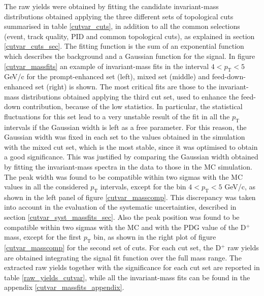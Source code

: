 \documentclass[b5paper,10pt,twoside,oldstyle,classica]{toptesi}
\newcommand{\pt}{p_\text{T}}
\begin{document}
The raw yields were obtained by fitting the candidate invariant-mass distributions obtained applying the three different sets of topological cuts summarised in table \ref{cutvar_cuts}, in addition to all the common selections (event, track quality, PID and common topological cuts), as explained in section \ref{cutvar_cuts_sec}. The fitting function is the sum of an exponential function which describes the background and a Gaussian function for the signal. In figure \ref{cutvar_massfits} an example of invariant-mass fits in the interval $4<\pt<5$ GeV/c for the prompt-enhanced set (left), mixed set (middle) and feed-down-enhanced set (right) is shown. The most critical fits are those to the invariant-mass distributions obtained applying the third cut set, used to enhance the feed-down contribution, because of the low statistics. In particular, the statistical fluctuations for this set lead to a very unstable result of the fit in all the $\pt$ intervals if the Gaussian width is left as a free parameter. For this reason, the Gaussian width was fixed in each set to the values obtained in the simulation with the mixed cut set, which is the most stable, since it was optimised to obtain a good significance. This was justified by comparing the Gaussian width obtained by fitting the invariant-mass spectra in the data to those in the MC simulation. The peak width was found to be compatible within two sigmas with the MC values in all the considered $\pt$ intervals, except for the bin $4<\pt<5$ GeV/c, as shown in the left panel of figure \ref{cutvar_masscomp}. This discrepancy was taken into account in the evaluation of the systematic uncertainties, described in section \ref{cutvar_syst_massfits_sec}. Also the peak position was found to be compatible within two sigmas with the MC and with the PDG value of the D$^+$ mass, except for the first $\pt$ bin, as shown in the right plot of figure \ref{cutvar_masscomp} for the second set of cuts. For each cut set, the D$^+$ raw yields are obtained integrating the signal fit function over the full mass range. The extracted raw yields together with the significance for each cut set are reported in table \ref{raw_yields_cutvar}, while all the invariant-mass fits can be found in the appendix \ref{cutvar_massfits_appendix}.   
\end{document}
